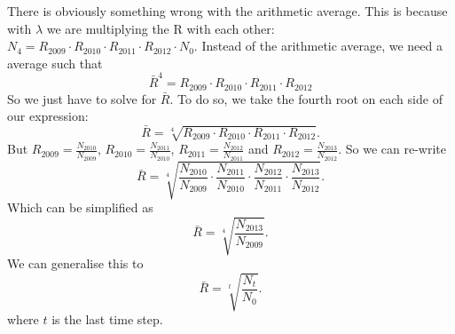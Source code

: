 \documentclass{article}\usepackage[]{graphicx}\usepackage[]{color}
\begin{document}
\noindent There is obviously something wrong with the arithmetic average. This is because with $\lambda$ we are multiplying the R with each other: $N_4=R_{2009} \cdot R_{2010} \cdot R_{2011} \cdot R_{2012} \cdot N_0$. Instead of the arithmetic average, we need a average such that
\begin{equation}
\bar R^4=R_{2009} \cdot R_{2010} \cdot R_{2011} \cdot R_{2012}
\end{equation}
\noindent So we just have to solve for $\bar R$. To do so, we take the fourth root on each side of our expression:
\begin{equation}
\bar{R}=\sqrt[4]{R_{2009} \cdot R_{2010} \cdot R_{2011} \cdot R_{2012}}.
\end{equation}
But $R_{2009}=\frac{N_{2010}}{N_{2009}}$, $R_{2010}=\frac{N_{2011}}{N_{2010}}$,  $R_{2011}=\frac{N_{2012}}{N_{2011}}$ and  $R_{2012}=\frac{N_{2013}}{N_{2012}}$. So we can re-write
\begin{equation}
\bar R=\sqrt[4]{\frac{N_{2010}}{N_{2009}} \cdot \frac{N_{2011}}{N_{2010}} \cdot \frac{N_{2012}}{N_{2011}} \cdot \frac{N_{2013}}{N_{2012}}}.
\end{equation}
Which can be simplified as
\begin{equation}
\bar R=\sqrt[4]{\frac{N_{2013}}{N_{2009}}}.
\end{equation}
\noindent We can generalise this to
\begin{equation}
\bar R=\sqrt[t]{\frac{N_{t}}{N_{0}}}.
\end{equation}
where $t$ is the last time step.

\end{document}
